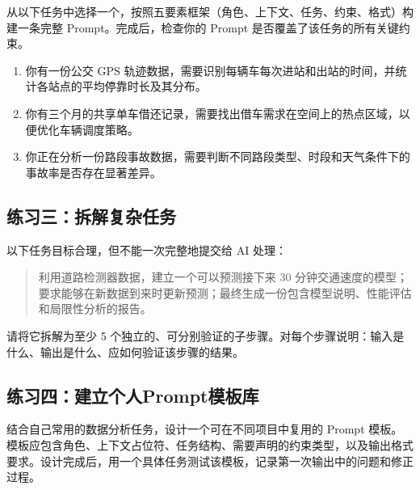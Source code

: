 从以下任务中选择一个，按照五要素框架（角色、上下文、任务、约束、格式）构建一条完整 Prompt。完成后，检查你的 Prompt 是否覆盖了该任务的所有关键约束。

\begin{enumerate}
  \item 你有一份公交 GPS 轨迹数据，需要识别每辆车每次进站和出站的时间，并统计各站点的平均停靠时长及其分布。
  \item 你有三个月的共享单车借还记录，需要找出借车需求在空间上的热点区域，以便优化车辆调度策略。
  \item 你正在分析一份路段事故数据，需要判断不同路段类型、时段和天气条件下的事故率是否存在显著差异。
\end{enumerate}

\subsection*{练习三：拆解复杂任务}

以下任务目标合理，但不能一次完整地提交给 AI 处理：

\begin{quote}
利用道路检测器数据，建立一个可以预测接下来 30 分钟交通速度的模型；要求能够在新数据到来时更新预测；最终生成一份包含模型说明、性能评估和局限性分析的报告。
\end{quote}

请将它拆解为至少 5 个独立的、可分别验证的子步骤。对每个步骤说明：输入是什么、输出是什么、应如何验证该步骤的结果。

\subsection*{练习四：建立个人Prompt模板库}

结合自己常用的数据分析任务，设计一个可在不同项目中复用的 Prompt 模板。模板应包含角色、上下文占位符、任务结构、需要声明的约束类型，以及输出格式要求。设计完成后，用一个具体任务测试该模板，记录第一次输出中的问题和修正过程。





